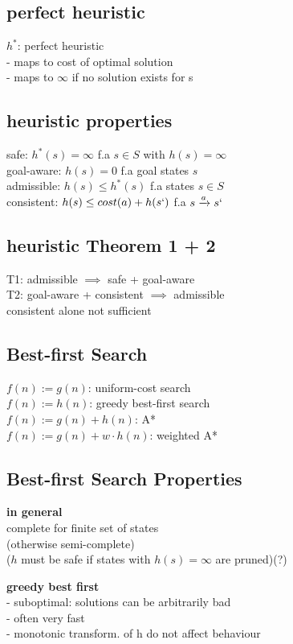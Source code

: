 \subsection*{perfect heuristic}
$h^{*}$: perfect heuristic \\
- maps to cost of optimal solution \\
- maps to $\infty$ if no solution exists for s 

\subsection*{heuristic properties}
safe: $h^{*}(s) = \infty$ f.a $s \in S$ with $h(s) = \infty$ \\
goal-aware: $h(s) = 0$ f.a goal states $s$ \\
admissible: $h(s) \leq h^{*}(s)$ f.a states $s \in S$ \\
consistent: $h(s) \leq cost(a) + h(s`)$ f.a $s \xrightarrow{a} s`$  

\subsection*{heuristic Theorem 1 + 2}
T1: admissible $\implies$ safe + goal-aware  \\
T2: goal-aware + consistent $\implies$ admissible\\
consistent alone not sufficient 

\subsection*{Best-first Search}
$f (n) := g (n)$: uniform-cost search \\
$f (n) := h(n)$: greedy best-first search \\
$f (n) := g (n) + h(n)$: A* \\
$f (n) := g (n) + w \cdot h(n)$: weighted A*


\subsection*{Best-first Search Properties}
\textbf{in general} \\
complete for finite set of states\\
(otherwise semi-complete) \\
($h$ must be safe if states with $h(s) = \infty$ are pruned)(?)

\textbf{greedy best first} \\
- suboptimal: solutions can be arbitrarily bad \\
- often very fast \\
- monotonic transform. of h do not affect behaviour

